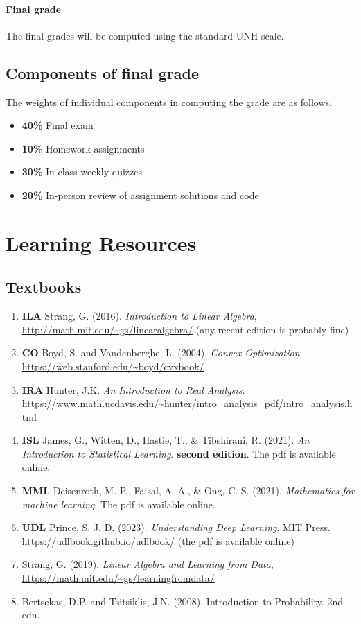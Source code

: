 \documentclass[11pt]{article}
\begin{document}
\paragraph{Final grade}
The final grades will be computed using the standard UNH scale.

\subsection{Components of final grade}

The weights of individual components in computing the grade are as follows. 
\begin{itemize}
\item \textbf{40\%} Final exam
\item \textbf{10\%} Homework assignments  
\item \textbf{30\%} In-class weekly quizzes 
\item \textbf{20\%} In-person review of assignment solutions and code
\end{itemize}

\section{Learning Resources}

\subsection{Textbooks}

\begin{enumerate}
\item \textbf{ILA} Strang, G. (2016). \emph{Introduction to Linear Algebra}, \url{http://math.mit.edu/~gs/linearalgebra/} (any recent edition is probably fine)
\item \textbf{CO} Boyd, S. and Vandenberghe, L. (2004). \emph{Convex Optimization}. \url{https://web.stanford.edu/~boyd/cvxbook/}
\item \textbf{IRA} Hunter, J.K. \emph{An Introduction to Real Analysis}. \url{https://www.math.ucdavis.edu/~hunter/intro_analysis_pdf/intro_analysis.html}
\item \textbf{ISL} James, G., Witten, D., Hastie, T., \& Tibshirani, R. (2021). \emph{An Introduction to Statistical Learning}. \textbf{second edition}. The pdf is available online.
\item \textbf{MML} Deisenroth, M. P., Faisal, A. A., \& Ong, C. S. (2021). \emph{Mathematics for machine learning}. The pdf is available online.
\item \textbf{UDL} Prince, S. J. D. (2023). \emph{Understanding Deep Learning}. MIT Press. \url{https://udlbook.github.io/udlbook/} (the pdf is available online)
\item Strang, G. (2019). \emph{Linear Algebra and Learning from Data}, \url{https://math.mit.edu/~gs/learningfromdata/}
\item Bertsekas, D.P. and Tsitsiklis, J.N. (2008). Introduction to Probability. 2nd edn.
\end{enumerate}
\end{document}

